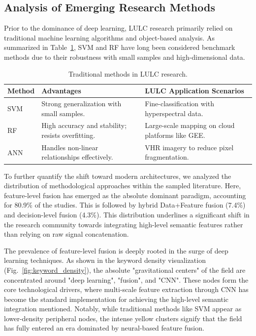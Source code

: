 \documentclass[]{interact}
\theoremstyle{plain}%
\theoremstyle{definition}
\theoremstyle{remark}
\begin{document}
\subsection{Analysis of Emerging Research Methods}
Prior to the dominance of deep learning, LULC research primarily relied on traditional machine learning algorithms and object-based analysis. As summarized in Table~\ref{tab:traditional_methods}, SVM and RF have long been considered benchmark methods due to their robustness with small samples and high-dimensional data.

\begin{table}[!ht]
	\centering
	\setlength{\belowcaptionskip}{5pt} 
	\caption{Traditional methods in LULC research.} 
	\label{tab:traditional_methods}
	\small 
	\renewcommand{\arraystretch}{1.4} 
	\begin{tabular}{@{} p{2.5cm} p{5.5cm} p{6.5cm} @{}} 
		\toprule
		\textbf{Method} & \textbf{Advantages} & \textbf{LULC Application Scenarios} \\ 
		\midrule
		SVM & Strong generalization with small samples. & Fine-classification with hyperspectral data. \\ \addlinespace[3pt]
		RF  & High accuracy and stability; resists overfitting. & Large-scale mapping on cloud platforms like GEE. \\ \addlinespace[3pt]
		ANN & Handles non-linear relationships effectively. & VHR imagery to reduce pixel fragmentation. \\ 
		\bottomrule
	\end{tabular}
\end{table}

To further quantify the shift toward modern architectures, we analyzed the distribution of methodological approaches within the sampled literature. Here, feature-level fusion has emerged as the absolute dominant paradigm, accounting for 80.9\% of the studies. This is followed by hybrid Data+Feature fusion (7.4\%) and decision-level fusion (4.3\%). This distribution underlines a significant shift in the research community towards integrating high-level semantic features rather than relying on raw signal concatenation.


The prevalence of feature-level fusion is deeply rooted in the surge of deep learning techniques. As shown in the keyword density visualization (Fig.~\ref{fig:keyword_density}), the absolute "gravitational centers" of the field are concentrated around "deep learning", "fusion", and "CNN". These nodes form the core technological drivers, where multi-scale feature extraction through CNN has become the standard implementation for achieving the high-level semantic integration mentioned. Notably, while traditional methods like SVM appear as lower-density peripheral nodes, the intense yellow clusters signify that the field has fully entered an era dominated by neural-based feature fusion.
\end{document}
